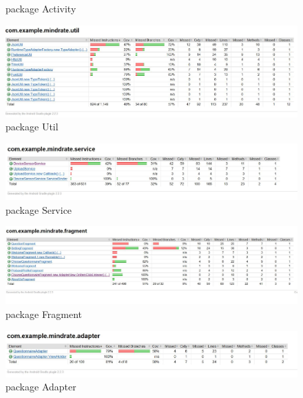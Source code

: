 \documentclass[a4paper]{scrreprt}
\begin{document}
\begin{itemize}
\begin{figure}[ht]
                    \caption{package Activity}
                \end{figure}
                \begin{figure}[ht]
                    \centering
                    \includegraphics[scale = 0.5]{packageUtil.jpg}
                    \caption{package Util}
                \end{figure}
                \begin{figure}[ht]
                    \centering
                    \includegraphics[scale = 0.6]{packageService.jpg}
                    \caption{package Service}
                \end{figure}
                \begin{figure}[ht]
                    \centering
                    \includegraphics[scale = 0.4]{packageFragment.jpg}
                    \caption{package Fragment}
                \end{figure}
                \begin{figure}[ht]
                    \centering
                    \includegraphics[scale = 0.5]{packageAdapter.jpg}
                    \caption{package Adapter}
                \end{figure}
                \end{itemize}
\end{document}
